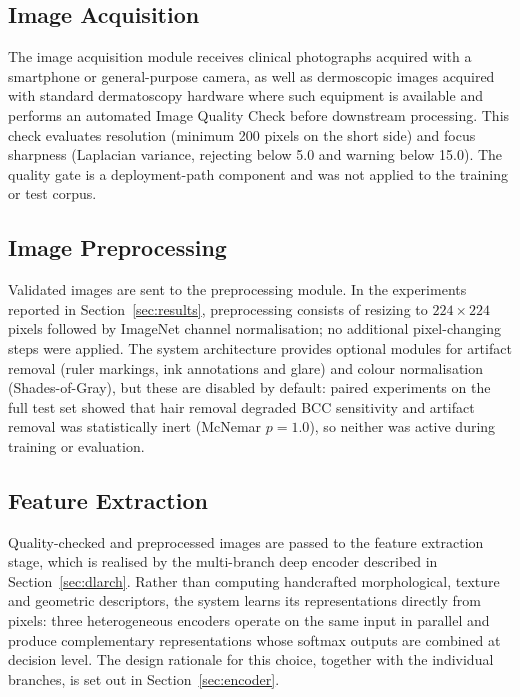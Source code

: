 \documentclass[pdflatex,sn-mathphys-num]{sn-jnl}%
\begin{document}
\subsection{Image Acquisition}

The image acquisition module receives clinical photographs acquired with a smartphone or
general-purpose camera, as well as dermoscopic images acquired with standard dermatoscopy
hardware where such equipment is available \cite{ref23} and performs an automated Image
Quality Check before downstream processing. This check evaluates resolution (minimum 200
pixels on the short side) and focus sharpness (Laplacian variance, rejecting below 5.0 and
warning below 15.0). The quality gate is a deployment-path component and was not applied to
the training or test corpus.

\subsection{Image Preprocessing}

Validated images are sent to the preprocessing module. In the experiments reported in
Section~\ref{sec:results}, preprocessing consists of resizing to $224 \times 224$ pixels
followed by ImageNet channel normalisation; no additional pixel-changing steps were applied.
The system architecture provides optional modules for artifact removal (ruler markings, ink
annotations and glare) and colour normalisation (Shades-of-Gray), but these are disabled by
default: paired experiments on the full test set showed that hair removal degraded BCC
sensitivity and artifact removal was statistically inert (McNemar $p = 1.0$), so neither was
active during training or evaluation.

\subsection{Feature Extraction}

Quality-checked and preprocessed images are passed to the feature extraction stage, which is
realised by the multi-branch deep encoder described in Section~\ref{sec:dlarch}. Rather than
computing handcrafted morphological, texture and geometric descriptors, the system learns its
representations directly from pixels: three heterogeneous encoders operate on the same input
in parallel and produce complementary representations whose softmax outputs are combined
at decision level. The design rationale for this choice, together with the individual
branches, is set out in Section~\ref{sec:encoder}.
\end{document}
